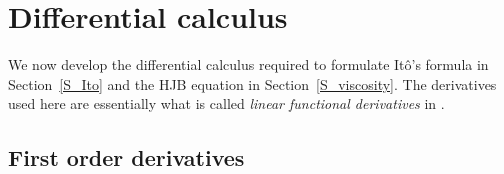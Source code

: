 \documentclass{article}
\newtheorem{corollary}[theorem]{Corollary}
\theoremstyle{definition}
\numberwithin{equation}{section}
\numberwithin{theorem}{section}
\newcommand{\E}{\mathbb{E}}
\newcommand{\R}{\mathbb{R}}
\newcommand{\dt}{\mathrm{d}t}
\newcommand{\me}{\mathrm{e}}
\newcommand{\Pcal}{{\mathcal P}}
\newcommand{\fdot}{{\,\cdot\,}}
\begin{document}










\section{Differential calculus}
\label{sec:diff-calc}


We now develop the differential calculus required to formulate It\^o's formula in Section~\ref{S_Ito} and the HJB equation in Section~\ref{S_viscosity}. The derivatives used here are essentially what is called \emph{linear functional derivatives} in \cite[Section~5.4]{car_del_18_I}.

\subsection{First order derivatives}
\end{document}
